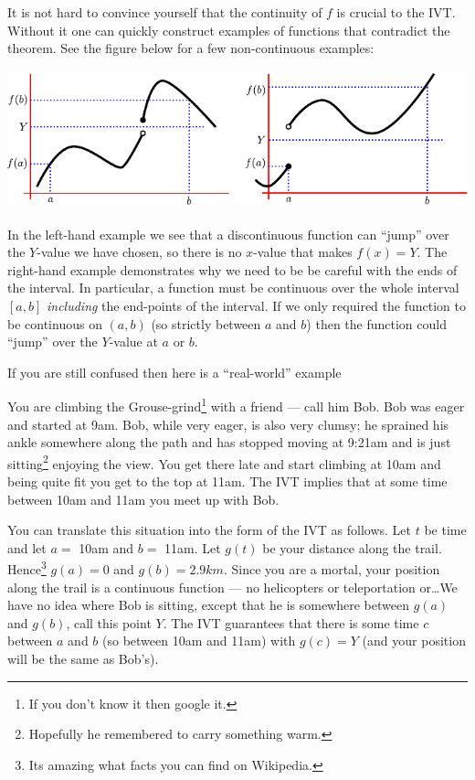 It is not hard to convince yourself that the continuity of $f$ is crucial to
the IVT. Without it one can quickly construct examples of functions that
contradict the theorem. See the figure below for a few non-continuous examples:
\begin{fig}
\begin{center}
 \includegraphics[height=4cm]{IVT2}
\end{center}
\end{fig}
In the left-hand example we see that a discontinuous function can ``jump'' over
the $Y$-value we have chosen, so there is no $x$-value that makes $f(x)=Y$. The
right-hand example demonstrates why we need to be be careful with the ends of
the interval. In particular, a function must be continuous over the whole
interval $[a,b]$ \emph{including} the end-points of the interval. If we only
required the function to be continuous on $(a,b)$ (so strictly between $a$ and
$b$) then the function could ``jump'' over the $Y$-value at $a$ or $b$.

If you are still confused then here is a ``real-world'' example
\begin{eg}
 You are climbing the Grouse-grind\footnote{If you don't know it then google
it.} with a friend --- call him Bob. Bob was eager and started at 9am. Bob,
while very eager, is also very clumsy; he sprained his ankle somewhere
along the path and has stopped moving at 9:21am and is just
sitting\footnote{Hopefully he remembered to carry something warm.} enjoying the
view. You get there late and start climbing at 10am and being quite fit you get to the
top at 11am. The IVT implies that at some time between 10am and 11am you
meet up with Bob.

You can translate this situation into the form of the IVT as follows. Let $t$
be time and let $a = $ 10am and $b=$ 11am. Let $g(t)$ be your distance
along the trail. Hence\footnote{Its amazing what facts you can find
on Wikipedia.} $g(a) = 0$ and
$g(b) = 2.9km$. Since you are a mortal, your position along the trail is a
continuous function --- no helicopters or teleportation or\dots We have no idea
where Bob is sitting, except that he is somewhere between $g(a)$ and
$g(b)$, call this point $Y$. The IVT guarantees that there is some time $c$
between $a$ and $b$ (so between 10am and 11am) with $g(c) = Y$ (and your
position will be the same as Bob's).
\end{eg}

